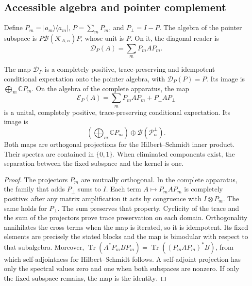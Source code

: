 \subsection{Accessible algebra and pointer complement}
\label{vii:vii:sec:observador-expectativa}

Define \(P_m=|a_m\rangle\langle a_m|\),
\(P=\sum_mP_m\), and \(P_\perp=I-P\). The algebra of the pointer
subspace is \(P\mathcal B(\mathcal K_{A,n})P\), whose unit is \(P\).
On it, the diagonal reader is
\[
 \mathcal D_P(A)=\sum_mP_mAP_m.
\]

\begin{proposition}
\label{vii:vii:prop:observador-pinzamiento}
The map \(\mathcal D_P\) is a completely positive,
trace-preserving and idempotent conditional expectation onto the
pointer algebra, with \(\mathcal D_P(P)=P\). Its image is
\(\bigoplus_m\mathbb CP_m\).
On the algebra of the complete apparatus, the map
\begin{equation}
 \mathcal E_P(A)=\sum_mP_mAP_m+P_\perp AP_\perp
 \label{vii:vii:eq:observador-complemento}
\end{equation}
is a unital, completely positive, trace-preserving
conditional expectation. Its image is
\[
 \left(\bigoplus_m\mathbb CP_m\right)
 \oplus\mathcal B(\mathcal P_n^\perp).
\]
Both maps are orthogonal projections for the Hilbert--Schmidt
inner product. Their spectra are contained in \(\{0,1\}\).
When eliminated components exist, the separation between the
fixed subspace and the kernel is one.
\end{proposition}

\begin{proof}
The projectors \(P_m\) are mutually orthogonal. In the complete
apparatus, the family that adds \(P_\perp\) sums to \(I\). Each term
\(A\mapsto P_mAP_m\) is completely positive: after any
matrix amplification it acts by congruence with \(I\otimes P_m\).
The same holds for \(P_\perp\). The sum preserves that property.
Cyclicity of the trace and the sum of the projectors prove
trace preservation on each domain. Orthogonality annihilates the
cross terms when the map is iterated, so it is idempotent.
Its fixed elements are precisely the stated blocks and the
map is bimodular with respect to that subalgebra.
Moreover,
\(\operatorname{Tr}(A^*P_mBP_m)
 =\operatorname{Tr}((P_mAP_m)^*B)\),
from which self-adjointness for Hilbert--Schmidt follows. A self-adjoint
projection has only the spectral values zero and one when
both subspaces are nonzero. If only the fixed subspace remains,
the map is the identity.
\end{proof}

